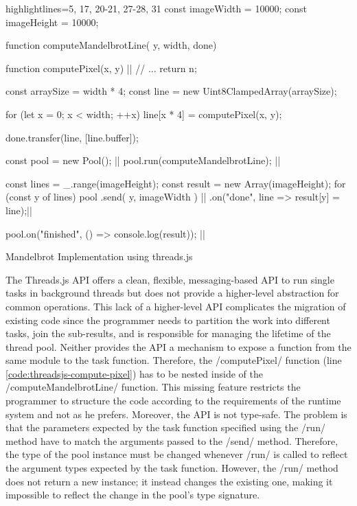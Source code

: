 \begin{listing}
	\begin{javascriptcode*}{highlightlines={5, 17, 20-21, 27-28, 31}}
const imageWidth = 10000;
const imageHeight = 10000;

function computeMandelbrotLine({ y, width}, done) {
	function computePixel(x, y) {|$\label{code:threadsjs-compute-pixel}$|
		// ...
		return n;
	}
	
	const arraySize = width * 4;
	const line = new Uint8ClampedArray(arraySize);

	for (let x = 0; x < width; ++x) {
		line[x * 4] = computePixel(x, y);
	}

	done.transfer(line, [line.buffer]);
}

const pool = new Pool(); |$\label{code:threadsjs-pool}$|
pool.run(computeMandelbrotLine); |$\label{code:threadsjs-worker}$|

const lines = _.range(imageHeight);
const result = new Array(imageHeight);
for (const y of lines) {
	pool
		.send({ y, imageWidth }) |$\label{code:threadsjs-messaging}$|
		.on("done", line => result[y] = line);|$\label{code:threadsjs-task-completion}$|
}

pool.on("finished", () => console.log(result)); |$\label{code:threadsjs-done}$|
\end{javascriptcode*}
\caption{Mandelbrot Implementation using threads.js}
\label{fig:mandelbrot-threadsjs}
\end{listing}


The Threads.js API offers a clean, flexible, messaging-based API to run single tasks in background threads but does not provide a higher-level abstraction for common operations. This lack of a higher-level API complicates the migration of existing code since the programmer needs to partition the work into different tasks, join the sub-results, and is responsible for managing the lifetime of the thread pool. Neither provides the API a mechanism to expose a function from the same module to the task function. Therefore, the \javascriptinline/computePixel/ function (line \ref{code:threadsjs-compute-pixel}) has to be nested inside of the \javascriptinline/computeMandelbrotLine/ function. This missing feature restricts the programmer to structure the code according to the requirements of the runtime system and not as he prefers. Moreover, the API is not type-safe. The problem is that the parameters expected by the task function specified using the \javascriptinline/run/ method have to match the arguments passed to the \javascriptinline/send/ method. Therefore, the type of the pool instance must be changed whenever \javascriptinline/run/ is called to reflect the argument types expected by the task function. However, the \javascriptinline/run/ method does not return a new instance; it instead changes the existing one, making it impossible to reflect the change in the pool's type signature.

